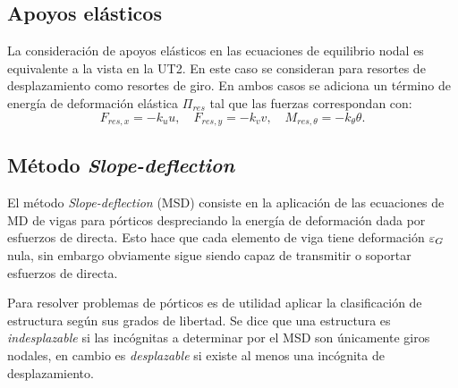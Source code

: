 %
%
%
%

\subsection{Apoyos elásticos}

La consideración de apoyos elásticos en las ecuaciones de equilibrio nodal es equivalente a la vista en la UT2. En este caso se consideran para resortes de desplazamiento como resortes de giro. En ambos casos se adiciona un término de energía de deformación elástica $\Pi_{res}$ tal que  las fuerzas correspondan con:
%
\begin{equation}
F_{res,x} = -k_u u , \quad
F_{res,y} = -k_v v, 
\quad 
M_{res,\theta} = -k_\theta \theta.
\end{equation}


\subsection{Método \textit{Slope-deflection}}

El método \textit{Slope-deflection} (MSD) consiste en la aplicación de las ecuaciones de MD de vigas para pórticos despreciando la energía de deformación dada por esfuerzos de directa. %
%
Esto hace que cada elemento de viga tiene deformación $\varepsilon_G$ nula, sin embargo obviamente sigue siendo capaz de transmitir o soportar esfuerzos de directa. %

Para resolver problemas de pórticos es de utilidad aplicar la clasificación de estructura según sus grados de libertad. Se dice que una estructura es \textit{indesplazable} si las incógnitas a determinar por el MSD son únicamente giros nodales, en cambio es \textit{desplazable} si existe al menos una incógnita de desplazamiento. %
%

